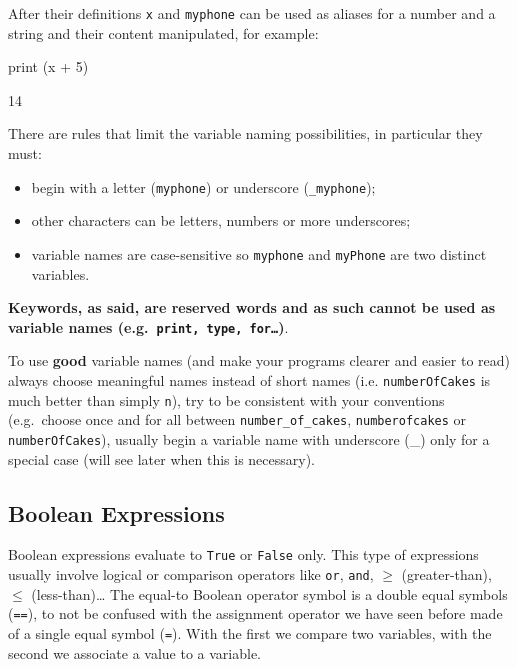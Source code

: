 After their definitions \texttt{x} and \texttt{myphone} can be used as aliases for a number and a string and their content manipulated, for example:

\begin{ipython}
print (x + 5)
\end{ipython}
\begin{ioutput}
14
\end{ioutput}

There are rules that limit the variable naming possibilities, in particular they must:
\begin{itemize}
\tightlist
\item begin with a letter (\texttt{myphone}) or underscore (\texttt{\_myphone});
\item other characters can be letters, numbers or more underscores;
\item variable names are case-sensitive so \texttt{myphone} and \texttt{myPhone} are two distinct variables.
\end{itemize}

\textbf{Keywords, as said, are reserved words and as such cannot be used as variable names (e.g.~\texttt{print, type, for\ldots})}.

To use \textbf{good} variable names (and make your programs clearer and easier to read) always choose meaningful names instead of short names (i.e. \texttt{numberOfCakes} is much better than simply \texttt{n}), try to be consistent with your conventions (e.g.~choose once and for all between \texttt{number\_of\_cakes}, \texttt{numberofcakes} or \texttt{numberOfCakes}), usually begin a variable name with underscore (\_) only for a special case (will see later when this is necessary).

\subsection{Boolean Expressions}\label{boolean-expressions}

Boolean expressions evaluate to \texttt{True} or \texttt{False} only. This type
of expressions usually involve logical or comparison operators like \texttt{or}, \texttt{and}, $\geq$ (greater-than), $\leq$ (less-than)\ldots
The equal-to Boolean operator symbol is a double equal symbols (\texttt{==}), to not be confused with the assignment operator we have seen before made of a single equal symbol (\texttt{=}). With the first we compare two variables, with the second we associate a value to a variable.

